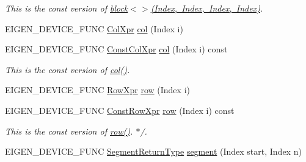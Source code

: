 \begin{DoxyCompactItemize}
\begin{DoxyCompactList}\small\item\em This is the const version of \mbox{\hyperlink{class_eigen_1_1_dense_base_ab8e42e67c5cfd5fa13e684642f0f65bf}{block$<$$>$(\+Index, Index, Index, Index)}}. \end{DoxyCompactList}\item 
E\+I\+G\+E\+N\+\_\+\+D\+E\+V\+I\+C\+E\+\_\+\+F\+U\+NC \mbox{\hyperlink{class_eigen_1_1_block}{Col\+Xpr}} \mbox{\hyperlink{class_eigen_1_1_dense_base_a469583ed90462820888344e63ebe1a80}{col}} (Index i)
\item 
\mbox{\label{class_eigen_1_1_dense_base_afdde4afe255ae631e18036492746e0ab}} 
E\+I\+G\+E\+N\+\_\+\+D\+E\+V\+I\+C\+E\+\_\+\+F\+U\+NC \mbox{\hyperlink{class_eigen_1_1_block}{Const\+Col\+Xpr}} \mbox{\hyperlink{class_eigen_1_1_dense_base_afdde4afe255ae631e18036492746e0ab}{col}} (Index i) const
\begin{DoxyCompactList}\small\item\em This is the const version of \mbox{\hyperlink{class_eigen_1_1_dense_base_a469583ed90462820888344e63ebe1a80}{col()}}. \end{DoxyCompactList}\item 
E\+I\+G\+E\+N\+\_\+\+D\+E\+V\+I\+C\+E\+\_\+\+F\+U\+NC \mbox{\hyperlink{class_eigen_1_1_block}{Row\+Xpr}} \mbox{\hyperlink{class_eigen_1_1_dense_base_a4ea11afe36c7962c706caa93decd1380}{row}} (Index i)
\item 
\mbox{\label{class_eigen_1_1_dense_base_a9cdec5bed1d69e7620c54d92ff741b3e}} 
E\+I\+G\+E\+N\+\_\+\+D\+E\+V\+I\+C\+E\+\_\+\+F\+U\+NC \mbox{\hyperlink{class_eigen_1_1_block}{Const\+Row\+Xpr}} \mbox{\hyperlink{class_eigen_1_1_dense_base_a9cdec5bed1d69e7620c54d92ff741b3e}{row}} (Index i) const
\begin{DoxyCompactList}\small\item\em This is the const version of \mbox{\hyperlink{class_eigen_1_1_dense_base_a4ea11afe36c7962c706caa93decd1380}{row()}}. $\ast$/. \end{DoxyCompactList}\item 
E\+I\+G\+E\+N\+\_\+\+D\+E\+V\+I\+C\+E\+\_\+\+F\+U\+NC \mbox{\hyperlink{class_eigen_1_1_vector_block}{Segment\+Return\+Type}} \mbox{\hyperlink{class_eigen_1_1_dense_base_a12704b924ecc7161a38b123901e9cc9e}{segment}} (Index start, Index n)
\item 
\mbox{\label{class_eigen_1_1_dense_base_af8f140343838bb04b92f511a953185f3}} 

\end{DoxyCompactItemize}
